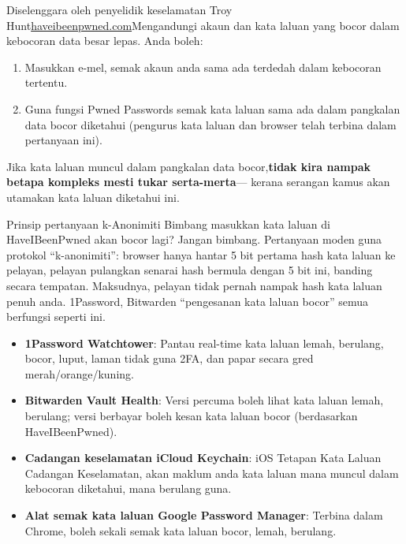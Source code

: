 
Diselenggara oleh penyelidik keselamatan Troy Hunt\href{https://haveibeenpwned.com}{haveibeenpwned.com}Mengandungi akaun dan kata laluan yang bocor dalam kebocoran data besar lepas. Anda boleh:

\begin{enumerate}
  \item Masukkan e-mel, semak akaun anda sama ada terdedah dalam kebocoran tertentu.
  \item Guna fungsi Pwned Passwords semak kata laluan sama ada dalam pangkalan data bocor diketahui (pengurus kata laluan dan browser telah terbina dalam pertanyaan ini).
\end{enumerate}

Jika kata laluan muncul dalam pangkalan data bocor,\textbf{tidak kira nampak betapa kompleks mesti tukar serta-merta}— kerana serangan kamus akan utamakan kata laluan diketahui ini.

\begin{tcbinfo}{Prinsip pertanyaan k-Anonimiti}
Bimbang masukkan kata laluan di HaveIBeenPwned akan bocor lagi? Jangan bimbang. Pertanyaan moden guna protokol “k-anonimiti”: browser hanya hantar 5 bit pertama hash kata laluan ke pelayan, pelayan pulangkan senarai hash bermula dengan 5 bit ini, banding secara tempatan. Maksudnya, pelayan tidak pernah nampak hash kata laluan penuh anda. 1Password, Bitwarden “pengesanan kata laluan bocor” semua berfungsi seperti ini.

\end{tcbinfo}


\begin{itemize}
  \item \textbf{1Password Watchtower}: Pantau real-time kata laluan lemah, berulang, bocor, luput, laman tidak guna 2FA, dan papar secara gred merah/orange/kuning.
  \item \textbf{Bitwarden Vault Health}: Versi percuma boleh lihat kata laluan lemah, berulang; versi berbayar boleh kesan kata laluan bocor (berdasarkan HaveIBeenPwned).
  \item \textbf{Cadangan keselamatan iCloud Keychain}: iOS Tetapan Kata Laluan Cadangan Keselamatan, akan maklum anda kata laluan mana muncul dalam kebocoran diketahui, mana berulang guna.
  \item \textbf{Alat semak kata laluan Google Password Manager}: Terbina dalam Chrome, boleh sekali semak kata laluan bocor, lemah, berulang.
\end{itemize}

